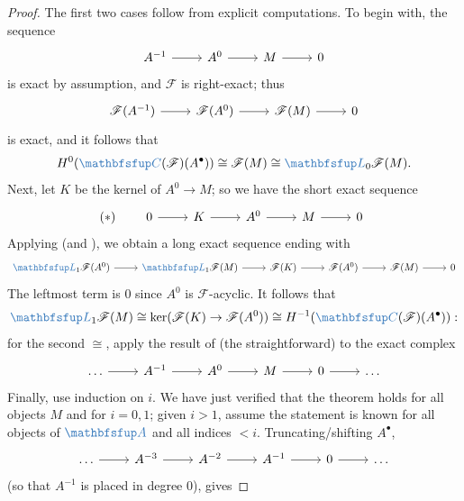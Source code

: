\begin{proof}
  The first two cases follow from explicit computations. To begin
  with, the sequence
  \[\begin{tikzcd}
      A^{-1} \arrow[r] & A^0 \arrow[r] & M \arrow[r] & 0
    \end{tikzcd}\] is exact by assumption, and $\mathscr{F}$ is
  right-exact; thus
  \[\begin{tikzcd}
      \mathscr{F}(A^{-1}) \arrow[r] & \mathscr{F}(A^0) \arrow[r] &
      \mathscr{F}(M) \arrow[r] & 0
    \end{tikzcd}\] is exact, and it follows that
  \[
    H^0(\categ{C}(\mathscr{F})(A^\bullet)) \cong \mathscr{F}(M) \cong
    \categ{L}_0\mathscr{F}(M).
  \]
  Next, let $K$ be the kernel of $A^0 \to M$; so we have the short
  exact sequence
  \[
    (*) \qquad
    \begin{tikzcd}
      0 \arrow[r] & K \arrow[r] & A^0 \arrow[r] & M \arrow[r] & 0
    \end{tikzcd}
  \]
  Applying  (and
  ), we obtain a long exact sequence
  ending with
  \[\begin{tikzcd}
      \categ{L}_1\mathscr{F}(A^0) \arrow[r] &
      \categ{L}_1\mathscr{F}(M) \arrow[r] & \mathscr{F}(K) \arrow[r] &
      \mathscr{F}(A^0) \arrow[r] & \mathscr{F}(M) \arrow[r] & 0
    \end{tikzcd}\] The leftmost term is $0$ since $A^0$ is
  $\mathscr{F}$-acyclic. It follows that
  \[
    \categ{L}_1\mathscr{F}(M) \cong \ker(\mathscr{F}(K) \to
    \mathscr{F}(A^0)) \cong H^{-1}(\categ{C}(\mathscr{F})(A^\bullet)):
  \]
  for the second $\cong$, apply the result of (the straightforward)
   to
  the exact complex
  \[\begin{tikzcd}
      \dots \arrow[r] & A^{-1} \arrow[r] & A^0 \arrow[r] & M \arrow[r]
      & 0 \arrow[r] & \dots
    \end{tikzcd}\] Finally, use induction on $i$. We have just
  verified that the theorem holds for all objects $M$ and for
  $i = 0, 1$; given $i > 1$, assume the statement is known for all
  objects of $\categ{A}$ and all indices $< i$. Truncating/shifting
  $A^\bullet$,
  \[\begin{tikzcd}
      \dots \arrow[r] & A^{-3} \arrow[r] & A^{-2} \arrow[r] & A^{-1}
      \arrow[r] & 0 \arrow[r] & \dots
    \end{tikzcd}\] (so that $A^{-1}$ is placed in degree $0$), gives

\end{proof}
